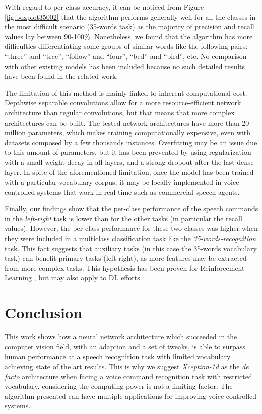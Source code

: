 With regard to per-class accuracy, it can be noticed from Figure \ref{fig:boxplot35002} that the algorithm performs generally well for all the classes in the most difficult scenario (35-words task) as the majority of precision and recall values lay between 90-100\%. Nonetheless, we found that the algorithm has more difficulties differentiating some groups of similar words like the following pairs: ``three'' and ``tree'', ``follow'' and ``four'', ``bed'' and ``bird'', etc. No comparison with other existing models has been included because no such detailed results have been found in the related work.

The limitation of this method is mainly linked to inherent computational cost. Depthwise separable convolutions allow for a more resource-efficient network architecture than regular convolutions, but that means that more complex architectures can be built. The tested network architectures have more than 20 million parameters, which makes training computationally expensive, even with datasets composed by a few thousands instances. Overfitting may be an issue due to this amount of parameters, but it has been prevented by using regularization with a small weight decay in all layers, and a strong dropout after the last dense layer. In spite of the aforementioned limitation, once the model has been trained with a particular vocabulary corpus, it may be locally implemented in voice-controlled systems that work in real time such as commercial speech agents.
  
Finally, our findings show that the per-class performance of the speech commands in the \textit{left-right} task is lower than for the other tasks (in particular the recall values). However, the per-class performance for these two classes was higher when they were included in a multiclass classification task like the \textit{35-words-recognition} task. This fact suggests that auxiliary tasks (in this case the 35-words vocabulary task) can benefit primary tasks (left-right), as more features may be extracted from more complex tasks. This hypothesis has been proven for Reinforcement Learning \cite{Jaderberg2016}, but may also apply to DL efforts.


\section{Conclusion} \label{sec:conclusion}
This work shows how a neural network architecture which succeeded in the computer vision field, with an adaption and a set of tweaks, is able to surpass human performance at a speech recognition task with limited vocabulary achieving state of the art results. This is why we suggest \textit{Xception-1d} as the \textit{de facto} architecture when facing a voice command recognition task with restricted vocabulary,  considering the computing power is not a limiting factor. The algorithm presented can have multiple  applications for improving voice-controlled systems. 

